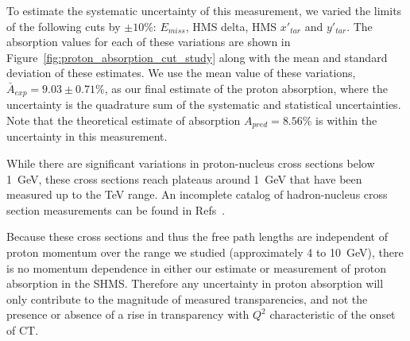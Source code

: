To estimate the systematic uncertainty of this measurement, we varied the limits
of the following cuts by $\pm10\%$: $E_{miss}$, HMS delta, HMS $x'_{tar}$ and
$y'_{tar}$.
The absorption values for each of these variations are shown in
Figure~\ref{fig:proton_absorption_cut_study} along with the mean and standard
deviation of these estimates.
We use the mean value of these variations,
$\bar{A}_{exp}=9.03\pm0.71\%$,
as our final estimate of the proton absorption, where the uncertainty is the
quadrature sum of the systematic and statistical uncertainties.
Note that the theoretical estimate of absorption $A_{pred}=8.56\%$
is within the uncertainty in this measurement.


While there are significant variations in proton-nucleus cross sections below
\SI{1}{\giga\electronvolt},
these cross sections reach plateaus around \SI{1}{\giga\electronvolt}
that have been measured up to the \si{\tera\electronvolt} range.
An incomplete catalog of hadron-nucleus cross section measurements can be found
in Refs~\cite{Carroll_1979, Kwong_1984, Denisov_1973, Ray_1979, Wellisch_1996,
Letaw_1983, Kohama_2016}.


Because these cross sections and thus the free path lengths are independent of
proton momentum over the range we studied (approximately 4 to
\SI{10}{\giga\electronvolt}), there is no momentum dependence in either our
estimate or measurement of proton absorption in the SHMS.
Therefore any uncertainty in proton absorption will only contribute to the
magnitude of measured transparencies, and not the presence or absence of a rise
in transparency with $Q^2$ characteristic of the onset of CT.

